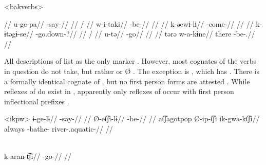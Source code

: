\pex[everyglpreamble=]<bakverbs> \bakairi \parencite[][131, 397, 76, 137, 374, 130]{von1892bakairi}
\begin{multicols}{2}
\begingl
\glpreamble {} //
\gla u-ge-pa//
\glb {}-say-//
\glft {}//
\endgl
{}
\begingl
\glpreamble {} /  //
\gla w-i-taki//
\glb {}-be-//
\glft {}//
\endgl
{}
\begingl
\glpreamble {} //
\gla k-əewɨ-lɨ//
\glb {}-come-//
\glft {}//
\endgl
{}
\begingl
\glpreamble {} //
\gla k-ɨtəgɨ-se//
\glb {}-go.down-?//
\glft {}//
\endgl
{}
\begingl
\glpreamble {} / //
\gla u-tə//
\glb {}-go//
\glft {}//
\endgl
{}
\begingl
\glpreamble {}//
\gla tərə w-a-kɨne//
\glb there -be-.//
\glft {}//
\endgl
\end{multicols}
\xe

All descriptions of \ikpeng list  as the only  marker \parencites[55]{ikpengpacheco1997}[105]{campetela1997analise}[64]{ikpengpacheco2001}[205]{alves2013verbo}.
However, most \ikpeng cognates of the verbs in question do not take, but rather  or Ø .
The exception is , which has  .
There is a formally identical \ikpeng cognate of \arara {} , but no first person forms are attested .
While reflexes of   do exist in \ikpeng, apparently only reflexes of   occur with first person inflectional prefixes \parencite[401]{gildea2018reconstructing}.

\pex<ikpw>\ikpeng
{}
\begingl
\gla ɨ-ge-lɨ//
\glb {}-say-//
\glft {} \parencite[][209]{ikpengpacheco2001}//
\endgl
{}
\begingl
\gla Ø-et͡ʃi-lɨ//
\glb {}-be-//
\glft {} \parencite[][139]{ikpengpacheco2001}//
\endgl
{}
\begingl
\gla at͡ʃagotpop Ø-ip-t͡ʃi ik-gwa-kt͡ʃi//
\glb always -bathe- river-.aquatic-//
\glft {} \parencite[][68]{ikpengpacheco1997}//
\endgl
\xe

\ikpeng \parencite[][80]{ikpengpacheco2001}\\
\begingl
\gla k-aran-t͡ʃi//
\glb {}-go-//
\glft {}//
\endgl
\xe

